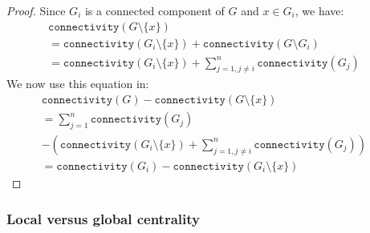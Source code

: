 \begin{proof}
Since $G_i$ is a connected component of $G$ and $x \in G_i$, we have:
\begin{equation*}
\begin{array}{ll}
\mathtt{connectivity}(G \setminus \{x\})  &  \\
 =  \mathtt{connectivity}(G_i \setminus \{x\}) + \mathtt{connectivity}(G \setminus G_i)&\\
 =  \mathtt{connectivity}(G_i \setminus \{x\}) + \sum_{j = 1, j \neq i}^{n} \mathtt{connectivity}(G_j)&
\end{array}
\end{equation*}
We now use this equation in:
\begin{equation*}
\begin{array}{ll}
\mathtt{connectivity}(G) - \mathtt{connectivity}(G \setminus \{x\})  &  \\
 =  \sum_{j = 1}^{n} \mathtt{connectivity}(G_j) & \\
- \left ( \mathtt{connectivity}(G_i \setminus \{x\}) + \sum_{j = 1, j \neq i}^{n} \mathtt{connectivity}(G_j)\right)& \\
 =  \mathtt{connectivity}(G_i) - \mathtt{connectivity}(G_i \setminus \{x\}) 
\end{array}
\end{equation*}
\end{proof}

\subsubsection{Local versus global centrality}

